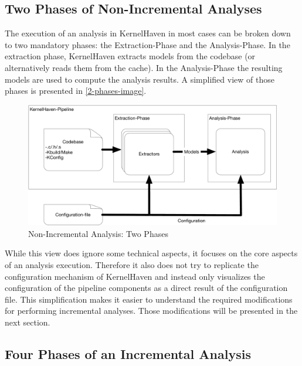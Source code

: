 \documentclass[a4paper]{article}
\begin{document}
\subsection{Two Phases of Non-Incremental Analyses}\label{2-phases}

The execution of an analysis in KernelHaven in most cases can be broken down to two mandatory phases: the Extraction-Phase and the Analysis-Phase. In the extraction phase, KernelHaven extracts models from the codebase  (or alternatively reads them from the cache). In the Analysis-Phase the resulting models are used to compute the analysis results. A simplified view of those phases is presented in \autoref{2-phases-image}.

\begin{figure}[h] 
  \centering
  \begin{minipage}[b]{1\textwidth} 
    \caption[Non-Incremental Analysis: Two Phases]{Non-Incremental Analysis: Two Phases}\label{2-phases-image}
    \includegraphics[width=1\textwidth]{img/KernelHaven.pdf}
  \end{minipage}
\end{figure}


While this view does ignore some technical aspects, it focuses on the core aspects of an analysis execution. Therefore it also does not try to replicate the configuration mechanism of KernelHaven and instead only visualizes the configuration of the pipeline components as a direct result of the configuration file. This simplification makes it easier to understand the required modifications for performing incremental analyses. Those modifications will be presented in the next section.

\subsection{Four Phases of an Incremental Analysis}
\end{document}
